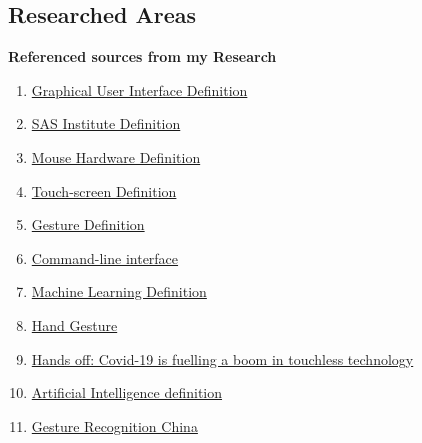 

\subsection{Researched Areas}

\textbf{Referenced sources from my Research}
\begin{enumerate}
  \item \href{https://www.britannica.com/technology/graphical-user-interface}{Graphical User Interface Definition} 
  
  \item \href{https://www.sas.com/en_ie/home.html}{SAS  Institute Definition} 
  \item \href{https://www.merriam-webster.com/dictionary/mouse}{Mouse Hardware Definition} 
   \item \href{https://www.merriam-webster.com/dictionary/touchscreen}{Touch-screen Definition} 


 \item \href{https://www.merriam-webster.com/dictionary/gesture}{Gesture Definition} 
 
\item \href{https://en.wikipedia.org/wiki/Command-line_interface}{Command-line interface} 




\item \href{https://www.sas.com/en_ie/insights/analytics/machine-learning.html#:~:text=Machine%20learning%20is%20a%20method,decisions%20with%20minimal%20human%20intervention.}{Machine Learning Definition} 



 \item \href{https://www.vision-systems.com/non-factory/life-sciences/article/16745252/hand-gesture-recognition-system-targets-medical-applications#:~:text=Researchers%20at%20Ben%20Gurion%20University,touch%20screens%20or%20computer%20keyboards.}{Hand Gesture} 
 
 \item \href{https://www.irishtimes.com/business/technology/hands-off-covid-19-is-fuelling-a-boom-in-touchless-technology-1.4462387}{Hands off:  Covid-19 is fuelling a boom in touchless technology} 

 \item \href{https://languages.oup.com/google-dictionary-en/}{Artificial Intelligence definition} 
 
 
\item \href {https://www.grandviewresearch.com/industry-analysis/gesture-recognition-market}{Gesture Recognition China} 



\end{enumerate}
